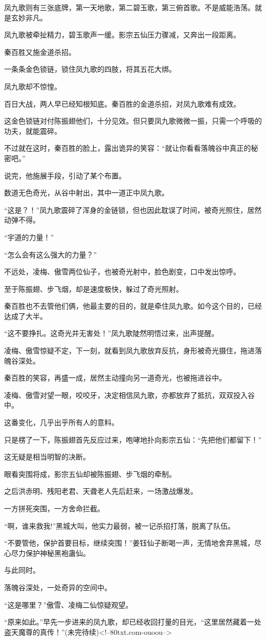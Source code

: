\begin{this_body}
凤九歌则有三张底牌，第一天地歌，第二碧玉歌，第三俯首歌。不是威能浩荡。就是玄妙非凡。

凤九歌被牵扯精力，碧玉歌声一缓。影宗五仙压力骤减，又奔出一段距离。

秦百胜又施金道杀招。

一条条金色锁链，锁住凤九歌的四肢，将其五花大绑。

凤九歌却不惊惶。

百日大战，两人早已经知根知底。秦百胜的金道杀招，对凤九歌难有成效。

这金色锁链对付陈振翅他们，十分见效。但只要凤九歌微微一振，只需一个呼吸的功夫，就能震碎。

不过就在这时，秦百胜的脸上，露出诡异的笑容：“就让你看看落魄谷中真正的秘密吧。”

说完，他施展手段，引动了某个布置。

数道无色奇光，从谷中射出，其中一道正中凤九歌。

“这是？！”凤九歌震碎了浑身的金链锁，但也因此耽误了时间，被奇光照住，居然动弹不得。

“宇道的力量！”

“怎么会有这么强大的力量？”

不远处，凌梅、傲雪两位仙子，也被奇光射中，脸色剧变，口中发出惊呼。

至于陈振翅、步飞烟，却是速度极快，躲过了奇光照射。

秦百胜也不去管他们俩，他最主要的目的，就是牵住凤九歌。如今这个目的，已经达成了大半。

“这不要挣扎。这奇光并无害处！”凤九歌陡然明悟过来，出声提醒。

凌梅、傲雪惊疑不定，下一刻，就看到凤九歌放弃反抗，身形被奇光摄住，拖进落魄谷深处。

秦百胜的笑容，再盛一成，居然主动撞向另一道奇光，也被拖进谷中。

凌梅、傲雪对望一眼，咬咬牙，决定相信凤九歌，亦都放弃了抵抗，双双投入谷中。

这番变化，几乎出乎所有人的意料。

只是楞了一下，陈振翅首先反应过来，咆哮地扑向影宗五仙：“先把他们都留下！”

这无疑是相当明智的决断。

眼看突围将成，影宗五仙却被陈振翅、步飞烟的牵制。

之后洪赤明、残阳老君、天聋老人先后赶来，一场激战爆发。

一方拼死突围，一方舍命拦截。

“啊，谁来救我!”黑城大叫，他实力最弱，被一记杀招打落，脱离了队伍。

“不要管他，保护首要目标，继续突围！”姜钰仙子断喝一声，无情地舍弃黑城，尽心尽力保护神秘黑袍蛊仙。

与此同时。

落魄谷深处，一处奇异的空间中。

“这是哪里？”傲雪、凌梅二仙惊疑观望。

“原来如此。”早先一步进来的凤九歌，却已经收回打量的目光，“这里居然藏着一处盗天魔尊的真传！”(未完待续)<!--80txt.com-ouoou-->

\end{this_body}

